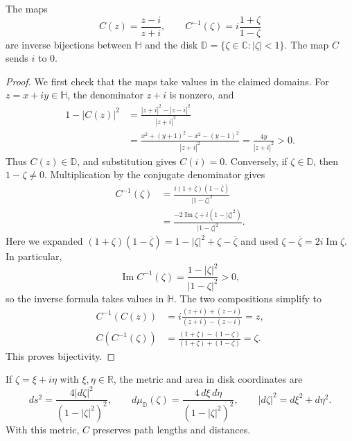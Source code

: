 \begin{proposition}\label{hyperbolic.cayley}
The maps
\begin{equation}\label{eq:cayley-maps}
 C(z)=\frac{z-i}{z+i},\qquad C^{-1}(\zeta)=i\frac{1+\zeta}{1-\zeta}
\end{equation}
are inverse bijections between $\mathbb H$ and the disk $\mathbb D=\{\zeta\in\mathbb C:|\zeta|<1\}$. The map $C$ sends $i$ to $0$.
\end{proposition}

\begin{proof}
We first check that the maps take values in the claimed domains. For $z=x+iy\in\mathbb H$, the denominator $z+i$ is nonzero, and
\[
 \begin{aligned}
 1-|C(z)|^2
 &=\frac{|z+i|^2-|z-i|^2}{|z+i|^2}\\
 &=\frac{x^2+(y+1)^2-x^2-(y-1)^2}{|z+i|^2}
 =\frac{4y}{|z+i|^2}>0.
 \end{aligned}
\]
Thus $C(z)\in\mathbb D$, and substitution gives $C(i)=0$. Conversely, if $\zeta\in\mathbb D$, then $1-\zeta\ne0$. Multiplication by the conjugate denominator gives
\[
 \begin{aligned}
 C^{-1}(\zeta)
 &=\frac{i(1+\zeta)(1-\overline\zeta)}{|1-\zeta|^2}\\
 &=\frac{-2\operatorname{Im}\zeta+i(1-|\zeta|^2)}{|1-\zeta|^2}.
 \end{aligned}
\]
Here we expanded $(1+\zeta)(1-\overline\zeta)=1-|\zeta|^2+\zeta-\overline\zeta$ and used $\zeta-\overline\zeta=2i\operatorname{Im}\zeta$. In particular,
\begin{equation}\label{eq:inverse-cayley-height}
 \operatorname{Im}C^{-1}(\zeta)=\frac{1-|\zeta|^2}{|1-\zeta|^2}>0,
\end{equation}
so the inverse formula takes values in $\mathbb H$. The two compositions simplify to
\[
 \begin{aligned}
 C^{-1}(C(z))
 &=i\frac{(z+i)+(z-i)}{(z+i)-(z-i)}=z,\\
 C(C^{-1}(\zeta))
 &=\frac{(1+\zeta)-(1-\zeta)}{(1+\zeta)+(1-\zeta)}=\zeta.
 \end{aligned}
\]
This proves bijectivity.
\end{proof}

\begin{proposition}\label{hyperbolic.disk-metric}
If $\zeta=\xi+i\eta$ with $\xi,\eta\in\mathbb R$, the metric and area in disk coordinates are
\begin{equation}\label{eq:disk-metric-area}
 ds^2=\frac{4|d\zeta|^2}{(1-|\zeta|^2)^2},\qquad
 d\mu_{\mathbb D}(\zeta)=\frac{4\,d\xi\,d\eta}{(1-|\zeta|^2)^2},
 \qquad |d\zeta|^2=d\xi^2+d\eta^2.
\end{equation} With this metric, $C$ preserves path lengths and distances.
\end{proposition}

